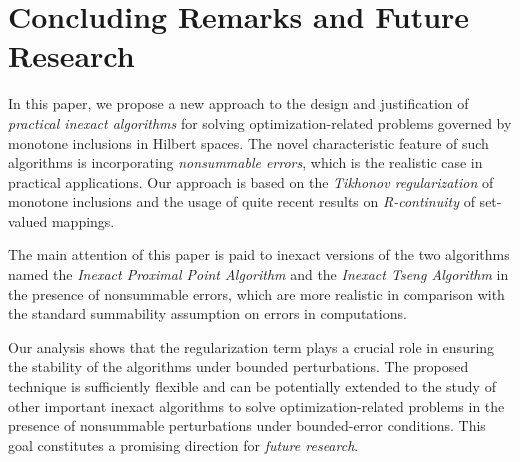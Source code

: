 \documentclass[12pt]{article}
\theoremstyle{plain}
\begin{document}
\section{Concluding Remarks and Future Research}\label{s5}

In this paper, we propose a new approach to the design and justification of {\it practical inexact algorithms} for solving optimization-related problems governed by monotone inclusions in Hilbert spaces. The novel characteristic feature of such algorithms  is incorporating {\it nonsummable errors}, which is the realistic case in practical applications. Our approach is based on the {\it Tikhonov regularization} of monotone inclusions and the usage of quite recent results on {\it R-continuity} of set-valued mappings.

The main attention of this paper is paid to inexact versions of the two algorithms named the {\it Inexact Proximal Point Algorithm}  and the {\it Inexact Tseng Algorithm} in the presence of nonsummable errors, which are more realistic in comparison with the standard summability assumption on errors in computations.

Our analysis shows that the regularization term plays a crucial role in ensuring the stability of the algorithms under bounded perturbations. The proposed technique is sufficiently flexible and can be potentially extended to the study of other important inexact algorithms to solve optimization-related problems in the presence of nonsummable perturbations under bounded-error conditions. This goal constitutes a promising direction for { {\it future research}}.
\end{document}
